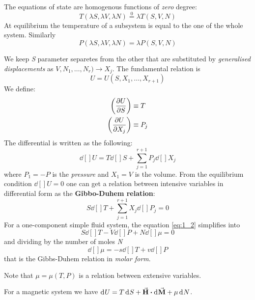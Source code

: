 \documentclass[../main/main.tex]{subfiles}
\begin{document}
The equations of state are homogenous functions of \emph{zero} degree:
\begin{equation}
  T (\lambda S, \lambda V, \lambda N) \overset{0}{=}  \lambda T (S,V,N)
  \label{eq:}
\end{equation}
At equilibrium the temperature of a subsystem is equal to the one of the whole system.
Similarly
\begin{equation}
  P (\lambda S, \lambda V, \lambda N) = \lambda P (S,V,N)
  \label{eq:}
\end{equation}

We keep \emph{S} parameter separetes from the other that are substituted by \emph{generalised displacements} as \( V,N_1,\dots,N_r) \rightarrow X_j \). The fundamental relation is
\begin{equation}
  U=U(S,X_1,\dots,X_{r+1})
\end{equation}
 We define:
\begin{subequations}
\begin{align}
  \qty(\pdv{U}{S}) & \equiv   T  \\
  \qty(\pdv{U}{X_j}) & \equiv  P_j
\end{align}
\end{subequations}
The differential is written as the following:
\begin{equation}
  \dd[]{U} = T \dd[]{S} + \sum_{j=1}^{r+1} P_j \dd[]{X_j}
  \label{eq:}
\end{equation}
where \( P_1 = -P \) is the \emph{pressure} and \( X_1 = V \) is the volume. From the equilibrium condition \( \dd[]{U} = 0 \) one can get a relation between intensive variables in differential form as the \textbf{Gibbo-Duhem relation}:
\begin{equation}
  S \dd[]{T} + \sum_{j=1}^{r+1} X_j \dd[]{P_j} = 0
  \label{eq:1_2}
\end{equation}
For a one-component simple fluid system, the equation \eqref{eq:1_2} simplifies into
\begin{equation}
  S \dd[]{T} - V \dd[]{P} + N \dd[]{\mu } = 0
  \label{eq:}
\end{equation}
and dividing by the number of moles \emph{N}
\begin{equation}
  \dd[]{\mu } = - s \dd[]{T} + v \dd[]{P}
  \label{eq:}
\end{equation}
that is the Gibbs-Duhem relation in \emph{molar form}.
\begin{remark}
Note that \( \mu = \mu (T,P) \) is a relation between extensive variables.
\end{remark}
\noindent For a magnetic system we have  \( \dd[]{U}  = T \dd[]{S}  + \va{H}  \vdot \dd[]{\va{M} }+ \mu \dd[]{N}  \).
\end{document}
